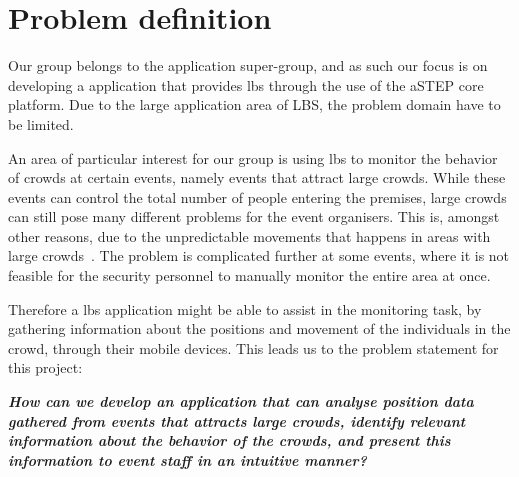 \section{Problem definition} \label{sec:problem_def}
Our group belongs to the application super-group, and as such our focus is on developing a application that provides \gls{lbs} through the use of the aSTEP core platform. Due to the large application area of LBS, the problem domain have to be limited. 

An area of particular interest for our group is using \gls{lbs} to monitor the behavior of crowds at certain events, namely events that attract large crowds. While these events can control the total number of people entering the premises, large crowds can still pose many different problems for the event organisers. This is, amongst other reasons, due to the unpredictable movements that happens in areas with large crowds~\cite{wirz2012inferring}. The problem is complicated further at some events, where it is not feasible for the security personnel to manually monitor the entire area at once. 

Therefore a \gls{lbs} application might be able to assist in the monitoring task, by gathering information about the positions and movement of the individuals in the crowd, through their mobile devices. This leads us to the problem statement for this project:

\vspace{0.5 cm}
\begin{center}
	\textbf{\textit{How can we develop an application that can analyse position data gathered from events that attracts large crowds, identify relevant information about the behavior of the crowds, and present this information to event staff in an intuitive manner?}}
\end{center}